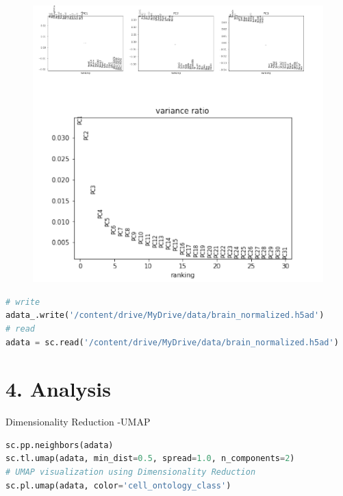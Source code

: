 \documentclass{article}
\begin{document}
\begin{figure}
    \centering
    \includegraphics{11.png}
\end{figure}         
\begin{lstlisting}[language=python]
# write
adata_.write('/content/drive/MyDrive/data/brain_normalized.h5ad')
# read
adata = sc.read('/content/drive/MyDrive/data/brain_normalized.h5ad')
\end{lstlisting}

\section*{4. Analysis}

Dimensionality Reduction -UMAP

\begin{lstlisting}[language=Python]
sc.pp.neighbors(adata)
sc.tl.umap(adata, min_dist=0.5, spread=1.0, n_components=2)
# UMAP visualization using Dimensionality Reduction
sc.pl.umap(adata, color='cell_ontology_class')
\end{lstlisting}
\end{document}
